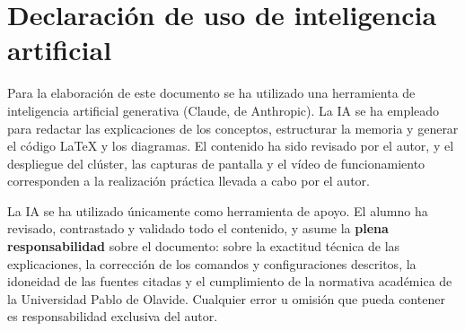 \documentclass[11pt,a4paper]{article}
\begin{document}
\section*{Declaración de uso de inteligencia artificial}

Para la elaboración de este documento se ha utilizado una herramienta de inteligencia artificial generativa (Claude, de Anthropic). La IA se ha empleado para redactar las explicaciones de los conceptos, estructurar la memoria y generar el código \LaTeX{} y los diagramas. El contenido ha sido revisado por el autor, y el despliegue del clúster, las capturas de pantalla y el vídeo de funcionamiento corresponden a la realización práctica llevada a cabo por el autor.

La IA se ha utilizado únicamente como herramienta de apoyo. El alumno ha revisado, contrastado y validado todo el contenido, y asume la \textbf{plena responsabilidad} sobre el documento: sobre la exactitud técnica de las explicaciones, la corrección de los comandos y configuraciones descritos, la idoneidad de las fuentes citadas y el cumplimiento de la normativa académica de la Universidad Pablo de Olavide. Cualquier error u omisión que pueda contener es responsabilidad exclusiva del autor.

\clearpage
{}
{}


\end{document}
